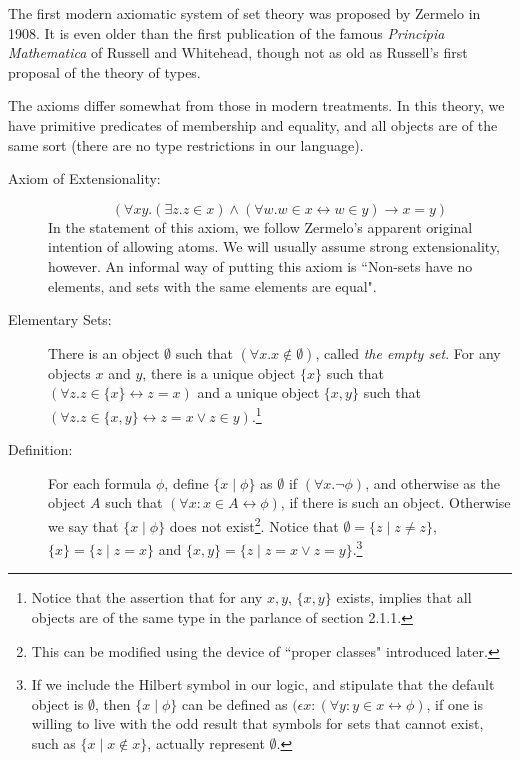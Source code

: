 \documentclass[12pt]{book}
\begin{document}
The first modern axiomatic system of set theory was proposed by
Zermelo in 1908.  It is even older than the first publication of the
famous {\em Principia Mathematica\/} of Russell and Whitehead, though
not as old as Russell's first proposal of the theory of types.

The axioms differ somewhat from those in modern treatments.  In this
theory, we have primitive predicates of membership and equality, and
all objects are of the same sort (there are no type restrictions in
our language).

\begin{description}

\item[Axiom of Extensionality:]  $$(\forall xy.(\exists z.z \in x) \wedge (\forall w.w \in x \leftrightarrow w \in y) \rightarrow x=y)$$  In the statement of this axiom, we follow Zermelo's apparent original intention of allowing atoms.  We will usually assume strong extensionality, however.  An informal way of putting this axiom is ``Non-sets have no elements, and sets with the same elements are equal".

\item[Elementary Sets:] There is an object $\emptyset$ such that $(\forall x.x \not\in  \emptyset)$, called {\em the empty set\/}.  For any
objects $x$ and $y$, there is a unique object $\{x\}$ such that $(\forall z.z\in \{x\} \leftrightarrow z=x)$ and a unique object $\{x,y\}$ such that
$(\forall z.z \in \{x,y\} \leftrightarrow z=x \vee z \in y)$.\footnote{Notice that the assertion that for any $x,y$, $\{x,y\}$ exists, implies that all objects are of the same type in the parlance of section 2.1.1.}

\item[Definition:]  For each formula $\phi$, define $\{x \mid \phi\}$ as $\emptyset$ if $(\forall x.\neg \phi)$, and otherwise as the object $A$
such that $(\forall x:x \in A \leftrightarrow \phi)$, if there is such an object.  Otherwise we say that $\{x \mid \phi\}$ does not exist\footnote{This can be modified using the device of ``proper classes" introduced later.}.  Notice that
$\emptyset=\{z\mid z \neq z\}$, $\{x\} = \{z\mid z=x\}$ and $\{x,y\} = \{z\mid z=x \vee z=y\}$.\footnote{If we include the Hilbert symbol in our logic, and stipulate that the default object is $\emptyset$, then $\{x \mid \phi\}$ can be defined as $(\epsilon x:(\forall y:y \in x \leftrightarrow \phi)$, if one is willing to live with the odd result that symbols for sets that cannot exist, such as $\{x \mid x \not\in x\}$, actually represent $\emptyset$.}


\end{description}
\end{document}
